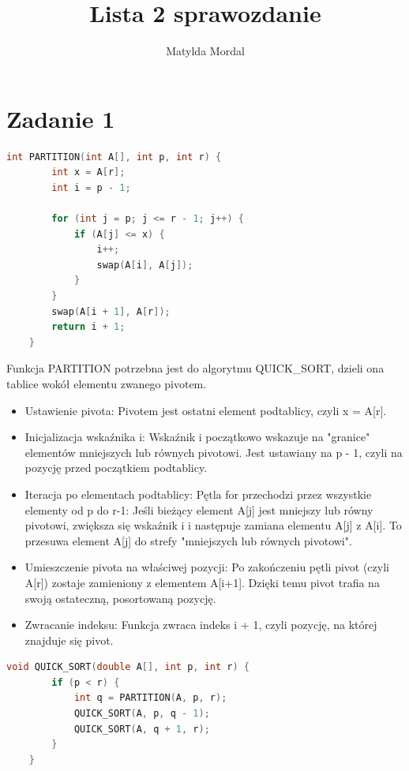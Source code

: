\documentclass{article}
\author{Matylda Mordal}
\title{\textbf{Lista 2 sprawozdanie}}
\date{}
\begin{document}
	\maketitle
	
	\section*{Zadanie 1}
	
	\begin{lstlisting}[language=C++, tabsize=3]
	int PARTITION(int A[], int p, int r) {
		int x = A[r];   
		int i = p - 1;   
		
		for (int j = p; j <= r - 1; j++) {
			if (A[j] <= x) {     
				i++;             
				swap(A[i], A[j]); 
			}
		}
		swap(A[i + 1], A[r]); 
		return i + 1; 
	}
	\end{lstlisting}
	
	Funkcja PARTITION potrzebna jest do algorytmu QUICK\_SORT, dzieli ona tablice wokół elementu zwanego pivotem.
	\begin{itemize}
		\item Ustawienie pivota: Pivotem jest ostatni element podtablicy, czyli x = A[r].
		
		\item Inicjalizacja wskaźnika i:
		Wskaźnik i początkowo wskazuje na "granice" elementów mniejszych lub równych pivotowi. Jest ustawiany na p - 1, czyli na pozycję przed początkiem podtablicy.
		
		\item Iteracja po elementach podtablicy:
		Pętla for przechodzi przez wszystkie elementy od p do r-1:
		Jeśli bieżący element A[j] jest mniejszy lub równy pivotowi, zwiększa się wskaźnik i i następuje zamiana elementu A[j] z A[i].
		To przesuwa element A[j] do strefy "mniejszych lub równych pivotowi".
		
		\item Umieszczenie pivota na właściwej pozycji:
		Po zakończeniu pętli pivot (czyli A[r]) zostaje zamieniony z elementem A[i+1]. Dzięki temu pivot trafia na swoją ostateczną, posortowaną pozycję.
		
		\item Zwracanie indeksu:
		Funkcja zwraca indeks i + 1, czyli pozycję, na której znajduje się pivot.
	\end{itemize}
	
	\begin{lstlisting}[language=C++, tabsize=3]
	void QUICK_SORT(double A[], int p, int r) {
		if (p < r) { 
			int q = PARTITION(A, p, r); 
			QUICK_SORT(A, p, q - 1);     
			QUICK_SORT(A, q + 1, r); 
		}
	}
	\end{lstlisting}
	
\end{document}
